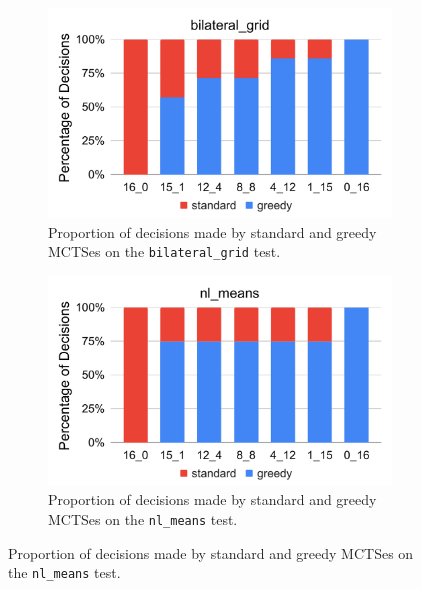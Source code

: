 \begin{figure}[!t]
    \centering

    \begin{subfigure}[t]{0.45\textwidth}
        \centering
        \includegraphics[width=\textwidth]{figures/bilateral_grid_random_to_greedy_ratio.pdf}
        \caption{Proportion of decisions made by standard and greedy MCTSes on the \texttt{bilateral\_grid} test.}
    \end{subfigure}
    \hspace{0.05\textwidth}
    \begin{subfigure}[t]{0.45\textwidth}
        \centering
        \includegraphics[width=\textwidth]{figures/nl_means_random_to_greedy_ratio.pdf}
        \caption{Proportion of decisions made by standard and greedy MCTSes on the \texttt{nl\_means} test.}
    \end{subfigure}
    

\end{figure}
